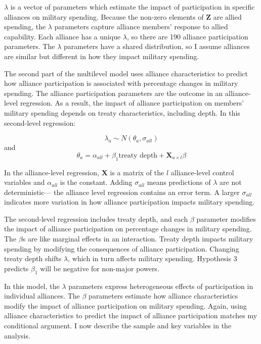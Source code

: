 \documentclass[12pt]{article}
\begin{document}
$\lambda$ is a vector of parameters which estimate the impact of participation in specific alliances on military spending. 
Because the non-zero elements of $\textbf{Z}$ are allied spending, the $\lambda$ parameters capture alliance members' response to allied capability. 
Each alliance has a unique $\lambda$, so there are 190 alliance participation parameters. 
The $\lambda$ parameters have a shared distribution, so I assume alliances are similar but different in how they impact military spending. 


The second part of the multilevel model uses alliance characteristics to predict how alliance participation is associated with percentage changes in military spending. 
The alliance participation parameters are the outcome in an alliance-level regression.
As a result, the impact of alliance participation on members' military spending depends on treaty characteristics, including depth. 
In this second-level regression: 


\begin{equation}
\lambda_{a} \sim N(\theta_{a}, \sigma_{all})
\end{equation} 
and 
\begin{equation}
\theta_{a} = \alpha_{all} + \beta_1 \mbox{treaty depth} + \textbf{X}_{a \times l} \beta
\end{equation}


In the alliance-level regression, $\textbf{X}$ is a matrix of the $l$ alliance-level control variables and $\alpha_{all}$ is the constant.
Adding $\sigma_{all}$ means predictions of $\lambda$ are not deterministic--- the alliance level regression contains an error term. 
A larger $\sigma_{all}$ indicates more variation in how alliance participation impacts military spending. 


The second-level regression includes treaty depth, and each $\beta$ parameter modifies the impact of alliance participation on percentage changes in military spending. 
The $\beta$s are like marginal effects in an interaction. 
Treaty depth impacts military spending by modifying the consequences of alliance participation. 
Changing treaty depth shifts $\lambda$, which in turn affects military spending.
Hypothesis 3 predicts $\beta_1$ will be negative for non-major powers. 


In this model, the $\lambda$ parameters express heterogeneous effects of participation in individual alliances.
The $\beta$ parameters estimate how alliance characteristics modify the impact of alliance participation on military spending.  
Again, using alliance characteristics to predict the impact of alliance participation matches my conditional argument. 
I now describe the sample and key variables in the analysis.  
\end{document}
